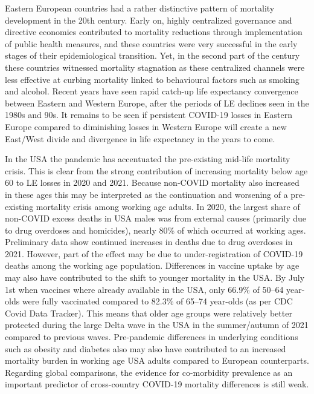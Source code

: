\documentclass[12pt]{article}
\begin{document}
Eastern European countries had a rather distinctive pattern of mortality development in the 20th century. Early on, highly centralized governance and directive economies contributed to mortality reductions through implementation of public health measures, and these countries were very successful in the early stages of their epidemiological transition.\citealp{Vishnevsky2015} Yet, in the second part of the century these countries witnessed mortality stagnation as these centralized channels were less effective at curbing mortality linked to behavioural factors such as smoking and alcohol.\citealp{Omran1971, Vallin2005} Recent years have seen rapid catch-up life expectancy convergence between Eastern and Western Europe, after the periods of LE declines seen in the 1980s and 90s.\citealp{Aburto2018, Timonin2016} It remains to be seen if persistent COVID-19 losses in Eastern Europe compared to diminishing losses in Western Europe will create a new East/West divide and divergence in life expectancy in the years to come.

In the USA the pandemic has accentuated the pre-existing mid-life mortality crisis. This is clear from the strong contribution of increasing mortality below age 60 to LE losses in 2020 and 2021. Because non-COVID mortality also increased in these ages this may be interpreted as the continuation and worsening of a pre-existing mortality crisis among working age adults.\citealp{Woolf2019} In 2020, the largest share of non-COVID excess deaths in USA males was from external causes (primarily due to drug overdoses and homicides), nearly 80\% of which occurred at working ages.\citealp{Glei2021}  Preliminary data show continued increases in deaths due to drug overdoses in 2021.\citealp{Dyer2021} However, part of the effect may be due to under-registration of COVID-19 deaths among the working age population. Differences in vaccine uptake by age may also have contributed to the shift to younger mortality in the USA. By July 1st when vaccines where already available in the USA, only 66.9\% of 50--64 year-olds were fully vaccinated compared to 82.3\% of 65--74 year-olds (as per CDC Covid Data Tracker). This means that older age groups were relatively better protected during the large Delta wave in the USA in the summer/autumn of 2021 compared to previous waves. Pre-pandemic differences in underlying conditions such as obesity and diabetes also may also have contributed to an increased mortality burden in working age USA adults compared to European counterparts.\citealp{Pongiglione2022} Regarding global comparisons, the evidence for co-morbidity prevalence as an important predictor of cross-country COVID-19 mortality differences is still weak.\citealp{Thakur2021}
\end{document}
